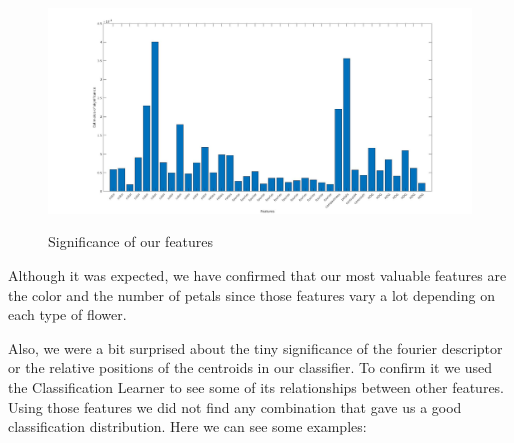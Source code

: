 \documentclass[11]{article}
\begin{document}
\begin{figure}[H]
    \centering
  \includegraphics[scale=0.25]{images/importance.jpg}
    \label{segmentation4}
    \caption{Significance of our features}
\end{figure}

Although it was expected, we have confirmed that our most valuable features are the color and the number of petals since those features vary a lot depending on each type of flower. 
\medskip

Also, we were a bit surprised about the tiny significance of the fourier descriptor or the relative positions of the centroids in our classifier. To confirm it we used the Classification Learner to see some of its relationships between other features. Using those features we did not find any combination that gave us a good classification distribution. Here we can see some examples: 
\end{document}
